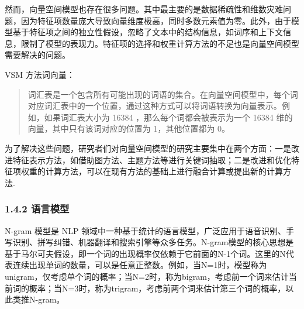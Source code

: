 \documentclass[12pt,a4paper]{book}
\begin{document}
然而，向量空间模型也存在很多问题。其中最主要的是数据稀疏性和维数灾难问题，因为特征项数量庞大导致向量维度极高，同时多数元素值为零。此外，由于模型基于特征项之间的独立性假设，忽略了文本中的结构信息，如词序和上下文信息，限制了模型的表现力。特征项的选择和权重计算方法的不足也是向量空间模型需要解决的问题。

VSM 方法词向量：

\begin{Shaded}
\begin{Highlighting}[]

\OperatorTok{=}\NormalTok{ [}\NormalTok{, }\NormalTok{, }\NormalTok{, }\NormalTok{, }\NormalTok{, }\NormalTok{, }\NormalTok{, ...]}
\end{Highlighting}
\end{Shaded}

\begin{quote}
词汇表是一个包含所有可能出现的词语的集合。在向量空间模型中，每个词对应词汇表中的一个位置，通过这种方式可以将词语转换为向量表示。例如，如果词汇表大小为
16384 ，那么每个词都会被表示为一个 16384
维的向量，其中只有该词对应的位置为 1，其他位置都为 0。
\end{quote}

为了解决这些问题，研究者们对向量空间模型的研究主要集中在两个方面：一是改进特征表示方法，如借助图方法、主题方法等进行关键词抽取；二是改进和优化特征项权重的计算方法，可以在现有方法的基础上进行融合计算或提出新的计算方法.

\subsubsection{1.4.2 语言模型}\label{ux8bedux8a00ux6a21ux578b}

N-gram 模型是 NLP
领域中一种基于统计的语言模型，广泛应用于语音识别、手写识别、拼写纠错、机器翻译和搜索引擎等众多任务。N-gram模型的核心思想是基于马尔可夫假设，即一个词的出现概率仅依赖于它前面的N-1个词。这里的N代表连续出现单词的数量，可以是任意正整数。例如，当N=1时，模型称为unigram，仅考虑单个词的概率；当N=2时，称为bigram，考虑前一个词来估计当前词的概率；当N=3时，称为trigram，考虑前两个词来估计第三个词的概率，以此类推N-gram。
\end{document}
